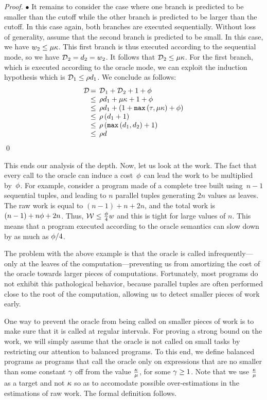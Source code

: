 \begin{proof}
$\bullet$  It remains to consider the case where one branch is predicted
to be smaller than the cutoff while the other branch is 
predicted to be larger than the cutoff.
In this case again, both branches are executed sequentially.
Without loss of generality, assume that the second branch is predicted
to be small. In this case, we have $w_2 \leq {\mu}{\kappa}$.
This first branch is thus executed according
to the sequential mode, so we have ${\mathcal{D}}{}_2 = d_2 = w_2$. 
It follows that ${\mathcal{D}}{}_2 \leq {\mu}{\kappa}$.
For the first branch, which is executed according to the oracle mode,
we can exploit the induction hypothesis which is ${\mathcal{D}}{}_1 \leq \rho{}d_1$.
We conclude as follows:
%
$$\begin{array}{l@{}l}
\sds & \Sc{=} \sds{}_1 + \sds{}_2 + 1 + \corc \\
& \Sc\leq \cspp{}d_1 + \cerr\coff + 1 + \corc\\
& \Sc\leq  \cspp{}d_1 + (1+\kwmax{\csp}{\cerr\coff}+\corc) \\
& \Sc\leq  \cspp{} \, (d_1 + 1) \\
& \Sc\leq  \cspp{} \,(\kwmax{ d_1 }{ d_2 } + 1) \\
& \Sc\leq  \cspp{} \sd
\end{array}$$
\qed
\end{proof}

This ends our analysis of the depth. Now, let us look at the work.
The fact that every call to the oracle can induce a cost~${\phi}$ can
lead the work to be multiplied by~${\phi}$.  For example, consider a
program made of a complete tree built using~$n-1$ sequential tuples,
and leading to $n$ parallel tuples generating $2n$ values as leaves.
The raw work is equal to $(n-1)+n+2n$, and the total work is
$(n-1)+n{\phi}+2n$.  Thus, ${\mathcal{W}} \le \frac{{\phi}}{4} w$ and this is
tight for large values of $n$.  This means that a program executed
according to the oracle semantics can slow down by as much as
${\phi}/4$.

The problem with the above example is that the oracle is called
infrequently---only at the leaves of the computation---preventing us
from amortizing the cost of the oracle towards larger pieces of
computations.  Fortunately, most programs do not exhibit this
pathological behavior, because parallel tuples are often performed
close to the root of the computation, allowing us to detect 
smaller pieces of work early. 

One way to prevent the oracle from being
called on smaller pieces of work is to make sure that it is called at
regular intervals.  For proving a strong bound on the
work, we will simply assume that the oracle is not called on small
tasks by restricting our attention to balanced programs. 
To this end, we define balanced programs as programs 
that call the oracle only on expressions that are no smaller 
than some constant ${\gamma}$ off from the value $\frac{{\kappa}}{{\mu}}$,
for some ${\gamma} \geq 1$. Note that we use $\frac{{\kappa}}{{\mu}}$ as
a target and not ${\kappa}$ so as to accomodate possible over-estimations
in the estimations of raw work.
The formal definition follows.

